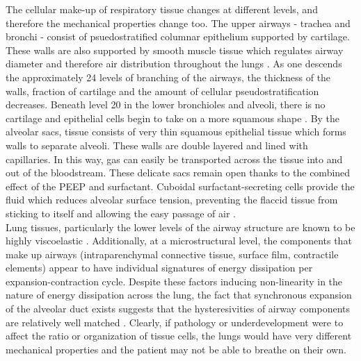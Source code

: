 \documentclass[12pt, openany, oneside]{book}
\begin{document}
The cellular make-up of respiratory tissue changes at different levels, and therefore the mechanical properties change too. The upper airways - trachea and bronchi - consist of psuedostratified columnar epithelium supported by cartilage. These walls are also supported by smooth muscle tissue which regulates airway diameter and therefore air distribution throughout the lungs \citep{hist}. As one descends the approximately 24 levels of branching of the airways, the thickness of the walls, fraction of cartilage and the amount of cellular pseudostratification decreases. Beneath level 20 in the lower bronchioles and alveoli, there is no cartilage and epithelial cells begin to take on a more squamous shape \citep{human}. By the alveolar sacs, tissue consists of very thin squamous epithelial tissue which forms walls to separate alveoli. These walls are double layered and lined with capillaries. In this way, gas can easily be transported across the tissue into and out of the bloodstream. These delicate sacs remain open thanks to the combined effect of the PEEP and surfactant. Cuboidal surfactant-secreting cells provide the fluid which reduces alveolar surface tension, preventing the flaccid tissue from sticking to itself and allowing the easy passage of air \citep{hist}.\\

Lung tissues, particularly the lower levels of the airway structure are known to be highly viscoelastic \citep{suki1994lung}. Additionally, at a microstructural level, the components that make up airways (intraparenchymal connective tissue, surface film, contractile elements) appear to have individual signatures of energy dissipation per expansion-contraction cycle. Despite these factors inducing non-linearity in the nature of energy dissipation across the lung, the fact that synchronous expansion of the alveolar duct exists suggests that the hysteresivities of airway components are relatively well matched \citep{fredberg}. Clearly, if pathology or underdevelopment were to affect the ratio or organization of tissue cells, the lungs would have very different mechanical properties and the patient may not be able to breathe on their own.

\end{document}
